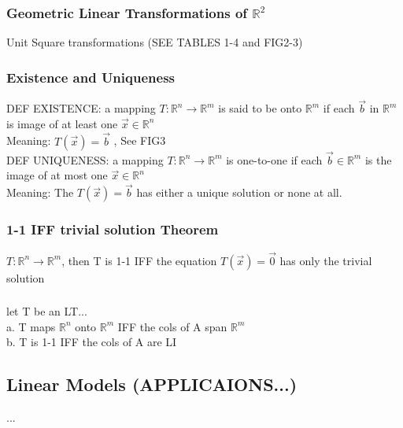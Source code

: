 \documentclass[12pt]{article}
\newcommand{\R}{\mathbb{R}}
\begin{document}
    \subsubsection{Geometric Linear Transformations of $\R^2$ }
    Unit Square transformations (SEE TABLES 1-4 and FIG2-3)
    \subsubsection{Existence and Uniqueness}
    DEF EXISTENCE: a mapping  $T: \R^n \rightarrow \R^m$ is said to be onto
    $ \R^m $  if each $ \vec b $  in $\R^m$  is image of 
    at least one $ \vec x \in \R^n $ \\
    Meaning: $ T(\vec x) = \vec b $ , See FIG3 \\
    DEF UNIQUENESS: a mapping  $T: \R^n \rightarrow \R^m$ is
    one-to-one if each $\vec b \in \R^m$ is the image of at most one
    $ \vec x \in \R^n $  \\
    Meaning: The $ T(\vec x) = \vec b$ has either a unique solution or
    none at all.
    \subsubsection{1-1 IFF trivial solution Theorem}
        $T: \R^n \rightarrow \R^m$, then T is 1-1 IFF the equation
        $ T(\vec x) = \vec 0$ has only the trivial solution
    \subsubsection{}
        let T be an LT...\\
        a. T maps $\R^n$ onto $\R^m$ IFF the cols of A span $ \R^m $  \\
        b. T is 1-1 IFF the cols of A are LI 
\subsection{Linear Models (APPLICAIONS...)}
    ...    
\end{document}
